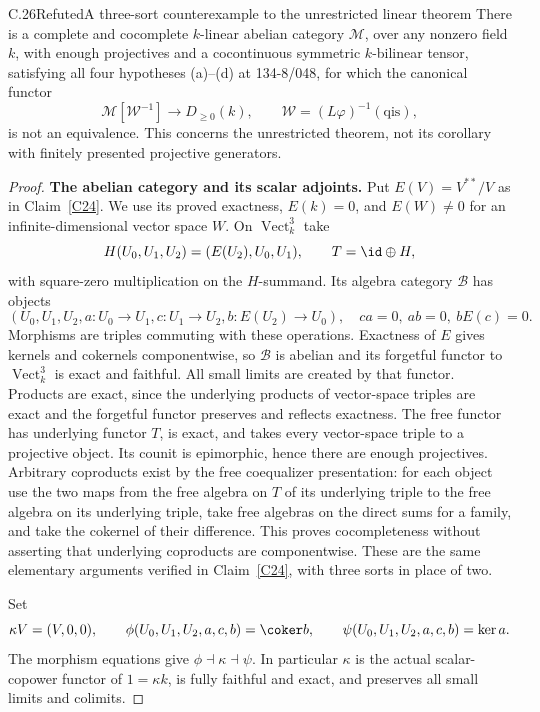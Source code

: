 \begin{claim}{C.26}{Refuted}{A three-sort counterexample to the unrestricted linear theorem}\label{C26}
There is a complete and cocomplete $k$-linear abelian category $\mathcal M$, over any nonzero field $k$, with enough projectives and a cocontinuous symmetric $k$-bilinear tensor, satisfying all four hypotheses (a)--(d) at 134-8/048, for which the canonical functor
\[
\mathcal M[\mathcal W^{-1}]\longrightarrow D_{\geq0}(k),
\qquad \mathcal W=(L\varphi)^{-1}(\mathrm{qis}),
\]
is not an equivalence. This concerns the unrestricted theorem, not its corollary with finitely presented projective generators.
\end{claim}
\begin{proof}
\textbf{The abelian category and its scalar adjoints.}
Put $E(V)=V^{**}/V$ as in Claim~\ref{C24}. We use its proved exactness, $E(k)=0$, and $E(W)\ne0$ for an infinite-dimensional vector space $W$. On $\operatorname{Vect}_k^3$ take
\[
H(U_0,U_1,U_2)=(E(U_2),U_0,U_1),\qquad T=\id\oplus H,
\]
with square-zero multiplication on the $H$-summand. Its algebra category $\mathcal B$ has objects
\[
(U_0,U_1,U_2,a:U_0\to U_1,c:U_1\to U_2,b:E(U_2)\to U_0),
\quad ca=0,\ ab=0,\ bE(c)=0.
\]
Morphisms are triples commuting with these operations. Exactness of $E$ gives kernels and cokernels componentwise, so $\mathcal B$ is abelian and its forgetful functor to $\operatorname{Vect}_k^3$ is exact and faithful. All small limits are created by that functor. Products are exact, since the underlying products of vector-space triples are exact and the forgetful functor preserves and reflects exactness. The free functor has underlying functor $T$, is exact, and takes every vector-space triple to a projective object. Its counit is epimorphic, hence there are enough projectives. Arbitrary coproducts exist by the free coequalizer presentation: for each object use the two maps from the free algebra on $T$ of its underlying triple to the free algebra on its underlying triple, take free algebras on the direct sums for a family, and take the cokernel of their difference. This proves cocompleteness without asserting that underlying coproducts are componentwise. These are the same elementary arguments verified in Claim~\ref{C24}, with three sorts in place of two.

Set
\[
\kappa V=(V,0,0),\qquad
\phi(U_0,U_1,U_2,a,c,b)=\coker b,\qquad
\psi(U_0,U_1,U_2,a,c,b)=\ker a.
\]
The morphism equations give $\phi\dashv\kappa\dashv\psi$. In particular $\kappa$ is the actual scalar-copower functor of $1=\kappa k$, is fully faithful and exact, and preserves all small limits and colimits.


\end{proof}
